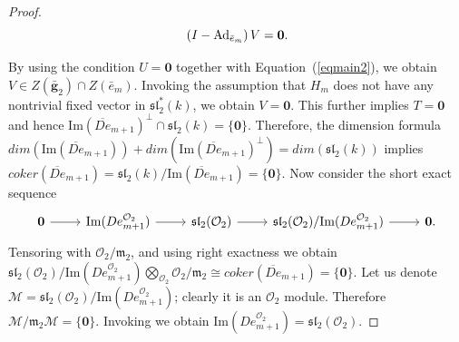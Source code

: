 \documentclass[10pt,twoside]{amsart}
\newcommand{\im}{\mathrm{Im}}
\newcommand{\R}{\mathcal{O}_2}
\theoremstyle{definition}
\theoremstyle{definition}
\begin{document}
\begin{proof}
\begin{equation}{\label{eqmain2}}
 \left(I-\mathrm{Ad}_{\bar e_m}\right)V =\mathbf{0}.
\end{equation}
 
By using the condition $U = \mathbf{0}$ together with Equation~(\ref{eqmain2}), we obtain $V\in Z(\mathbf{\bar g}_2) \cap Z(\bar e_m)$. Invoking the assumption that $H_m$ does not have any nontrivial fixed vector in $\mathfrak{sl}_2^*(k)$, we obtain $V = \mathbf{0}$. This further implies $T = \mathbf{0}$ and hence $\im(\overline{De}_{m+1})^\perp \cap \mathfrak{sl}_2(k) = \{\mathbf{0}\}$. Therefore, the dimension formula $dim(\im(\overline{De}_{m+1})) + dim(\im(\overline{De}_{m+1})^\perp) = dim (\mathfrak{sl}_2(k))$ implies $coker(\overline{De}_{m+1}) = \mathfrak{sl}_2(k)/ \im(\overline{De}_{m+1}) = \{\mathbf{0}\}$. Now consider the short exact sequence 
\[\begin{tikzcd}
	\mathbf{0} & {\im(De^{\R}_{m+1})} & {\mathfrak{sl}_2(\mathcal{O}_2)} & {\mathfrak{sl}_2(\mathcal{O}_2)/\im(De^{\R}_{m+1})} & \mathbf{0}.
	\arrow[from=1-1, to=1-2]
	\arrow[from=1-2, to=1-3]
	\arrow[from=1-3, to=1-4]
	\arrow[from=1-4, to=1-5]
\end{tikzcd}\]
Tensoring with $\mathcal{O}_2/\mathfrak{m}_2$, and using right exactness we obtain $\mathfrak{sl}_2(\mathcal{O}_2)/\im(De^{\R}_{m+1})\bigotimes_{\mathcal{O}_2}\mathcal{O}_2/\mathfrak{m}_2\cong coker(\overline{De}_{m+1}) = \{\mathbf{0}\}$. Let us denote $\mathcal{M} = \mathfrak{sl}_2(\mathcal{O}_2)/ \im(De^{\R}_{m+1})$; clearly it is an $\mathcal{O}_2$ module. Therefore $\mathcal{M}/ \mathfrak{m}_2\mathcal{M} = \{\mathbf{0}\}$. Invoking \cite[Proposition 2.6]{Atiyahmacdonald} we obtain $\im(De^{\R}_{m+1}) = \mathfrak{sl}_2(\mathcal{O}_2)$.


\end{proof}
\end{document}
